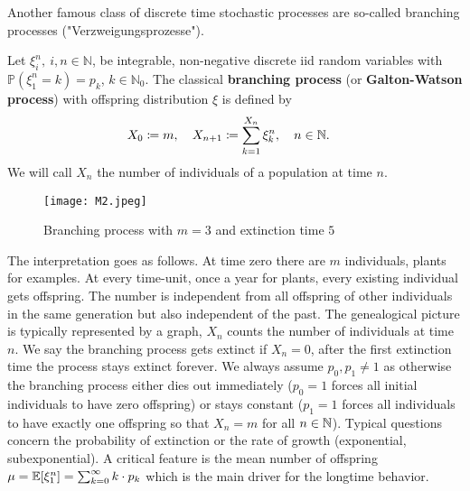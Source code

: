 \begin{example}\label{GW}		
 Another famous class of discrete time stochastic processes are so-called branching processes ("{}Verzweigungsprozesse"{}). 
\begin{lbeispiel}
	Let $\xi_i^n,\: i,n\in \mathbb{N}$, be integrable, non-negative discrete iid random variables with $\mathbb{P}(\xi_1^n=k) = p_k$, $k\in\mathbb{N}_0$. 
	The classical \textbf{branching process} (or \textbf{Galton-Watson process}) with offspring distribution $\xi$ is defined by
	\begin{align*}
		X_0 &\coloneqq m,\quad	X_{n+1} \coloneqq \sum_{k=1}^{X_n}\xi_k^n,\quad n\in\mathbb{N}.
	\end{align*}
	We will call $X_n$ the number of individuals of a population at time $n$.
\end{lbeispiel}
	\begin{figure}[h]
	\begin{center}
		\texttt{[image: M2.jpeg]}		
	\end{center}
		\vspace{-0.3cm}
	\caption*{Branching process with $m=3$ and extinction time $5$}
\end{figure}

	The interpretation goes as follows. At time zero there are $m$ individuals, plants for examples. At every time-unit, once a year for plants, every existing individual gets offspring. The number is independent from all offspring of other individuals in the same generation but also independent of the past. The genealogical picture is typically represented by a graph, $X_n$ counts the number of individuals at time $n$. We say the branching process gets extinct if $X_n=0$, after the first extinction time the process stays extinct forever. We always assume $p_0,p_1\neq 1$ as otherwise the branching process either dies out immediately ($p_0=1$ forces all initial individuals to have zero offspring) or stays constant ($p_1=1$ forces all individuals to have exactly one offspring so that $X_n=m$ for all $n\in\mathbb{N}$). Typical questions concern the probability of extinction or the rate of growth (exponential, subexponential). A critical feature is the mean number of offspring $\mu =\mathbb{E}[\xi_1^n] = \sum_{k=0}^{\infty}k\cdot p_k$ which is the main driver for the longtime behavior.\smallskip
	

\end{example}
